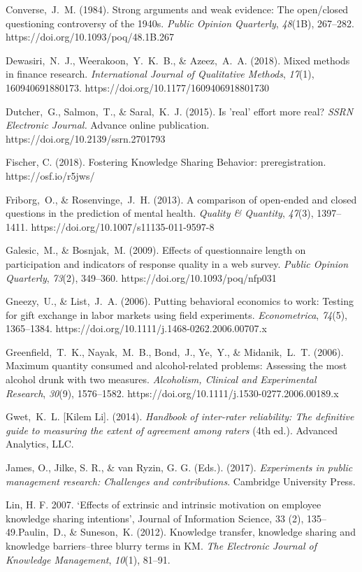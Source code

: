 \documentclass{article}
\begin{document}
Converse, J. M. (1984). Strong arguments and weak evidence: The open/closed questioning controversy of the 1940s. \emph{Public Opinion Quarterly}, \emph{48}(1B), 267--282. https://doi.org/10.1093/poq/48.1B.267

Dewasiri, N. J., Weerakoon, Y. K. B., \& Azeez, A. A. (2018). Mixed methods in finance research. \emph{International Journal of Qualitative Methods}, \emph{17}(1), 160940691880173. https://doi.org/10.1177/1609406918801730

Dutcher, G., Salmon, T., \& Saral, K. J. (2015). Is 'real' effort more real? \emph{SSRN Electronic Journal. }Advance online publication. https://doi.org/10.2139/ssrn.2701793

Fischer, C. (2018). Fostering Knowledge Sharing Behavior: preregistration. https://osf.io/r5jws/

Friborg, O., \& Rosenvinge, J. H. (2013). A comparison of open-ended and closed questions in the prediction of mental health. \emph{Quality \& Quantity}, \emph{47}(3), 1397--1411. https://doi.org/10.1007/s11135-011-9597-8

Galesic, M., \& Bosnjak, M. (2009). Effects of questionnaire length on participation and indicators of response quality in a web survey. \emph{Public Opinion Quarterly}, \emph{73}(2), 349--360. https://doi.org/10.1093/poq/nfp031

Gneezy, U., \& List, J. A. (2006). Putting behavioral economics to work: Testing for gift exchange in labor markets using field experiments. \emph{Econometrica}, \emph{74}(5), 1365--1384. https://doi.org/10.1111/j.1468-0262.2006.00707.x

Greenfield, T. K., Nayak, M. B., Bond, J., Ye, Y., \& Midanik, L. T. (2006). Maximum quantity consumed and alcohol-related problems: Assessing the most alcohol drunk with two measures. \emph{Alcoholism, Clinical and Experimental Research}, \emph{30}(9), 1576--1582. https://doi.org/10.1111/j.1530-0277.2006.00189.x

Gwet, K. L. [Kilem Li]. (2014). \emph{Handbook of inter-rater reliability: The definitive guide to measuring the extent of agreement among raters} (4th ed.). Advanced Analytics, LLC. 

James, O., Jilke, S. R., \& van Ryzin, G. G. (Eds.). (2017). \emph{Experiments in public management research: Challenges and contributions}. Cambridge University Press. 

Lin, H. F. 2007. ‘Effects of extrinsic and intrinsic motivation on employee knowledge sharing intentions', Journal of Information Science, 33 (2), 135--49.Paulin, D., \& Suneson, K. (2012). Knowledge transfer, knowledge sharing and knowledge barriers--three blurry terms in KM. \emph{The Electronic Journal of Knowledge Management}, \emph{10}(1), 81--91.
\end{document}
